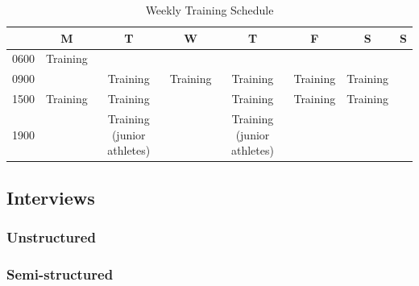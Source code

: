 {     %
    \begin{landscape}
      \begin{table}[htpb]\caption{Weekly Training Schedule}
        \begin{center}
          \begin{small}
              \begin{tabular}{| c | c | c | c | c | c | c | c |}
                \hline
                & \bf M & \bf T & \bf W & \bf T & \bf F & \bf S & \bf S \\
                \hline
                0600 & Training &  &  & & & & \\
                \hline
                0900 &  & Training & Training & Training & Training & Training &  \\
                  \hline
                1500 & Training & Training & & Training & Training & Training &  \\
                  \hline
                1900 &  & Training (junior athletes) & & Training (junior athletes) & & & \\
                   \hline
              \end{tabular}
            \end{small}
          \end{center}
        \end{table}
    \end{landscape}
    \restoregeometry







  \subsection{Interviews}


    \subsubsection{Unstructured}


    \subsubsection{Semi-structured} %

}
